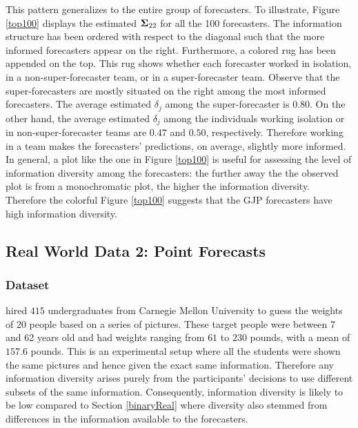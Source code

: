 \documentclass[11pt]{article}
\theoremstyle{definition}
\theoremstyle{definition}
\def\bSigma{{\bf \Sigma}}
\begin{document}
This pattern generalizes to the entire group of forecasters. To illustrate, Figure  \ref{top100} displays the estimated $\bSigma_{22}$ for all the 100 forecasters. The information structure has been ordered with respect to the diagonal such that the more informed forecasters appear on the right. Furthermore, a colored rug has been appended on the top. This rug shows whether each forecaster worked in isolation, in a non-super-forecaster team, or in a super-forecaster team. Observe that the super-forecasters are mostly situated on the right among the most informed forecasters. The average estimated $\delta_j$ among the super-forecaster is $0.80$.  On the other hand, the average estimated $\delta_j$ among the individuals working isolation or in non-super-forecaster teams are $0.47$ and $0.50$, respectively. Therefore working in a team makes the forecasters' predictions, on average, slightly more informed. In general, a plot like the one in Figure  \ref{top100} is useful for assessing the level of information diversity among the forecasters: the further away the the observed plot is from a monochromatic plot, the higher the information diversity. Therefore the colorful Figure  \ref{top100} suggests that the GJP forecasters have high information diversity. 




\subsection{Real World Data 2: Point Forecasts}
\label{continuousReal}
\subsubsection{Dataset}
\citet{moore2008use} hired $415$ undergraduates from Carnegie Mellon University to guess the weights of $20$ people based on a series of pictures. These target people were between 7 and 62 years old and had weights ranging from $61$ to $230$ pounds, with a mean of $157.6$ pounds. This is an experimental setup where all the students were shown the same pictures and hence given the exact same information. 
Therefore any information diversity arises purely from the participants' decisions to use different subsets of the same information. 
Consequently, information diversity is likely to be low compared to Section \ref{binaryReal} where diversity also stemmed from differences in the information available to the forecasters.
\end{document}
